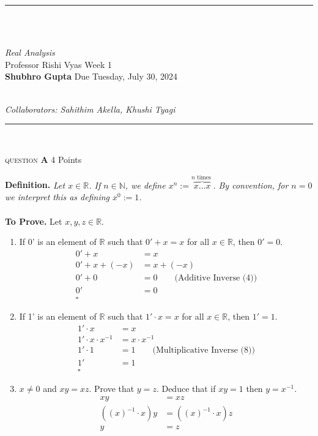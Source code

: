 \documentclass[11pt]{article}
\newcommand{\problem
}[2]{
\begin{mdframed}
    \textsc{question} \textbf{#1} \hfill #2
\end{mdframed}
}
\newcommand{\heading}[5]{
\hrule ~\\~\\
\begin{large}
\noindent\emph{#1}\smallskip ~\\
Professor #3 \hfill Week #2 \smallskip ~\\
\textbf{Shubhro Gupta} \hfill Due #4 ~\\
\end{large} \medskip ~\\
{\emph{Collaborators: #5}}~\\
\hrule
\vspace{50pt}
~\\
}
\begin{document}
\heading{Real Analysis}{1}{Rishi Vyas}{Tuesday, July 30, 2024}{Sahithim Akella, Khushi Tyagi }

\problem{A}{4 Points}
\textbf{Definition.} \emph{Let $x \in \mathbb{R}$. If $n \in \mathbb{N}$, we define $x^n:=\overbrace{x \ldots x}^{n \text { times }}$. By convention, for $n=0$ we interpret this as defining $x^0:=1$.}~\\
\\
\textbf{To Prove.}  Let $x, y, z \in \mathbb{R}$.

\begin{enumerate}
	\item If 0' is an element of $\mathbb{R}$ such that $0'+x=x$ for all $x \in \mathbb{R}$, then $0'=0$.
	      \begin{align*}
		      0' + x        & = x                                             \\
		      0' + x + (-x) & = x + (-x)                                      \\
		      0' + 0        & = 0        \qquad \text{(Additive Inverse (4))} \\
		      0'            & = 0                                             \\
		      \square
	      \end{align*}
	\item If 1' is an element of $\mathbb{R}$ such that $1' \cdot x=x$ for all $x \in \mathbb{R}$, then $1'=1$.
	      \begin{align*}
		      1' \cdot x              & = x                                                   \\
		      1' \cdot x \cdot x^{-1} & = x \cdot x^{-1}                                      \\
		      1' \cdot 1              & = 1        \qquad \text{(Multiplicative Inverse (8))} \\
		      1'                      & = 1                                                   \\
		      \square
	      \end{align*}
	\item $x \neq 0$ and $x y=x z$. Prove that $y=z$. Deduce that if $x y=1$ then $y=x^{-1}$.
	      \begin{align*}
		      x y                  & = x z                  \\
		      ((x)^{-1} \cdot x) y & = ((x)^{-1} \cdot x) z \\
		      y                    & = z                    \\

\end{align*}
\end{enumerate}
\end{document}
